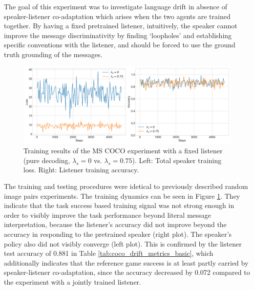 The goal of this experiment was to investigate language drift in absence of speaker-listener co-adaptation which arises when the two agents are trained together. By having a fixed pretrained listener, intuitively, the speaker cannot improve the message discriminativity by finding `loopholes' and establishing specific conventions with the listener, and should be forced to use the ground truth grounding of the messages.

\begin{figure}
	\centering
	\includegraphics[width=\linewidth]{images/coco_fixedListener_baseline_random_0_075_losses.png}
	\caption{Training results of the MS COCO experiment with a fixed listener (pure decoding, $\lambda_s=0$ vs. $\lambda_s=0.75$). Left: Total speaker training loss. Right: Listener training accuracy.}
	\label{fig:coco_fixed_listener_speaker_loss_listener_acc_075}
\end{figure}

The training and testing procedures were idetical to previously described random image pairs experiments. The training dynamics can be seen in Figure \ref{fig:coco_fixed_listener_speaker_loss_listener_acc_075}. They indicate that the task success based training signal was not strong enough in order to visibly improve the task performance beyond literal message interpretation, because the listener's accuracy did not improve beyond the accuracy in responding to the pretrained speaker (right plot). The speaker's policy also did not visibly converge (left plot). 
This is confirmed by the listener test accuracy of 0.881 in Table \ref{tab:coco_drift_metrics_basic}, which additionally indicates that the reference game success is at least partly carried by speaker-listener co-adaptation, since the accuracy decreased by 0.072 compared to the experiment with a jointly trained listener. 

